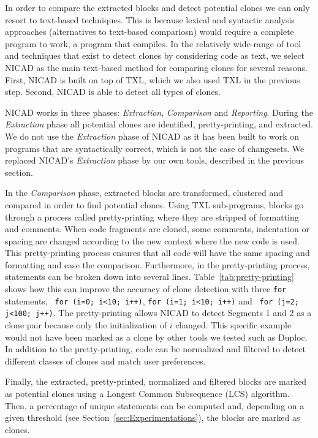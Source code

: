 \documentclass[conference]{IEEEtran}
\begin{document}
In order to compare the extracted blocks and detect potential clones we can only resort to text-based techniques.
This is because lexical and syntactic analysis approaches (alternatives to text-based compariosn) would require a complete program to work, a program that compiles. In the relatively wide-range of tool and techniques that exist to detect clones by considering code as text\cite{Johnson1993,Johnson1994,Marcus,Manber1994,StephaneDucasse,Wettel2005}, we select NICAD as the main text-based method for comparing clones \cite{Cordy2011} for several reasons.
First, NICAD is built on top of TXL, which we also used TXL in the previous step.
Second, NICAD is able to detect all types of clones.

NICAD  works in three phases: \textit{Extraction}, \textit{Comparison} and \textit{Reporting}. During the \textit{Extraction} phase all potential clones are identified, pretty-printing, and extracted.
We do not use the \textit{Extraction} phase of NICAD as it has been built to work on programs that are syntactically correct, which is not the case of changesets.
We replaced NICAD's \textit{Extraction} phase by our own tools, described in the previous section.

In the \textit{Comparison} phase, extracted blocks are transformed, clustered and compared in order to find potential clones.
Using TXL sub-programs, blocks go through a process called pretty-printing where they are stripped of formatting and comments.
When code fragments are cloned, some comments, indentation or spacing are changed according to the new context where the new code is used. This pretty-printing process ensures that all code will have the same spacing and formatting and ease the comparison.
Furthermore, in the pretty-printing process, statements can be broken down into several lines.
Table~\ref{tab:pretty-printing} shows how this can improve the accuracy of clone detection with three \texttt{for} statements, \texttt{ for (i=0; i<10; i++)}, \texttt{for (i=1; i<10; i++)} and \texttt{ for (j=2; j<100; j++)}.
The pretty-printing allows NICAD to detect Segments 1 and 2 as a clone pair because only the initialization of $i$ changed.
This specific example would not have been marked as a clone by other  tools we tested such as Duploc\cite{Ducasse1999}.
In addition to the pretty-printing, code can be normalized and filtered to detect different classes of clones and match user preferences.



Finally, the extracted, pretty-printed, normalized and filtered blocks are marked as potential clones using a Longest Common Subsequence (LCS) algorithm\cite{Hunt1977}. Then, a percentage of unique statements can be computed and, depending on a given threshold (see Section~\ref{sec:Experimentations}), the blocks are marked as clones.
\end{document}

